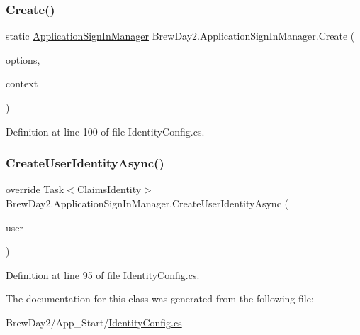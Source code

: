 \subsubsection{\texorpdfstring{Create()}{Create()}}
{\footnotesize\ttfamily static \mbox{\hyperlink{class_brew_day2_1_1_application_sign_in_manager}{Application\+Sign\+In\+Manager}} Brew\+Day2.\+Application\+Sign\+In\+Manager.\+Create (\begin{DoxyParamCaption}\item[{Identity\+Factory\+Options$<$ \mbox{\hyperlink{class_brew_day2_1_1_application_sign_in_manager}{Application\+Sign\+In\+Manager}} $>$}]{options,  }\item[{I\+Owin\+Context}]{context }\end{DoxyParamCaption})\hspace{0.3cm}{\ttfamily [static]}}



Definition at line 100 of file Identity\+Config.\+cs.

\mbox{\label{class_brew_day2_1_1_application_sign_in_manager_ab672d1f9fc4c7a2ac8ccf6c34993b7a2}} 
\subsubsection{\texorpdfstring{Create\+User\+Identity\+Async()}{CreateUserIdentityAsync()}}
{\footnotesize\ttfamily override Task$<$Claims\+Identity$>$ Brew\+Day2.\+Application\+Sign\+In\+Manager.\+Create\+User\+Identity\+Async (\begin{DoxyParamCaption}\item[{\mbox{\hyperlink{class_brew_day2_1_1_models_1_1_application_user}{Application\+User}}}]{user }\end{DoxyParamCaption})}



Definition at line 95 of file Identity\+Config.\+cs.



The documentation for this class was generated from the following file\+:\begin{DoxyCompactItemize}
\item 
Brew\+Day2/\+App\+\_\+\+Start/\mbox{\hyperlink{_identity_config_8cs}{Identity\+Config.\+cs}}\end{DoxyCompactItemize}
